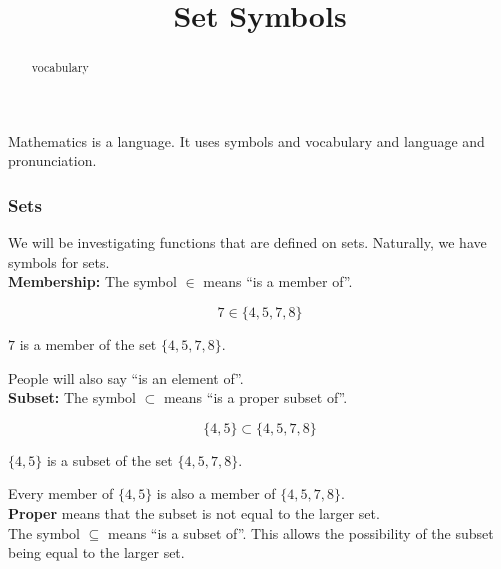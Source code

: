 \documentclass{ximera}
\title{Set Symbols}
\begin{document}
\begin{abstract}
vocabulary
\end{abstract}
\maketitle




Mathematics is a language.  It uses symbols and vocabulary and language and pronunciation. \\




\subsubsection*{Sets}



We will be investigating functions that are defined on sets. Naturally, we have symbols for sets. \\



\textbf{\textcolor{blue!55!black}{Membership:}}  The symbol $\in$ means ``is a member of''.


\[
7 \in \{ 4, 5, 7, 8 \}
\]

\begin{center}

$7$ is a member of the set $\{ 4, 5, 7, 8 \}$.

\end{center}

People will also say ``is an element of''. \\





\textbf{\textcolor{blue!55!black}{Subset:}}  The symbol $\subset$ means ``is a proper subset of''.


\[
\{ 4, 5 \} \subset \{ 4, 5, 7, 8 \}
\]

\begin{center}

$\{ 4, 5 \}$ is a subset of the set $\{ 4, 5, 7, 8 \}$.

\end{center}


Every member of $\{ 4, 5 \}$ is also a member of $\{ 4, 5, 7, 8 \}$. \\


\textbf{Proper} means that the subset is not equal to the larger set. \\


The symbol $\subseteq$ means ``is a subset of''.  This allows the possibility of the subset being equal to the larger set.
\end{document}
